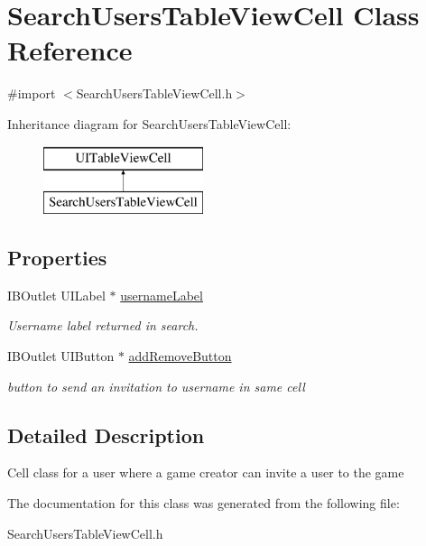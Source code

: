 \hypertarget{interface_search_users_table_view_cell}{\section{Search\+Users\+Table\+View\+Cell Class Reference}
\label{interface_search_users_table_view_cell}
}


{\ttfamily \#import $<$Search\+Users\+Table\+View\+Cell.\+h$>$}

Inheritance diagram for Search\+Users\+Table\+View\+Cell\+:\begin{figure}[H]
\begin{center}
\leavevmode
\includegraphics[height=2.000000cm]{interface_search_users_table_view_cell}
\end{center}
\end{figure}
\subsection*{Properties}
\begin{DoxyCompactItemize}
\item 
\hypertarget{interface_search_users_table_view_cell_a96cc65a772a6d5b580c15eebdedc28e5}{I\+B\+Outlet U\+I\+Label $\ast$ \hyperlink{interface_search_users_table_view_cell_a96cc65a772a6d5b580c15eebdedc28e5}{username\+Label}}\label{interface_search_users_table_view_cell_a96cc65a772a6d5b580c15eebdedc28e5}

\begin{DoxyCompactList}\small\item\em Username label returned in search. \end{DoxyCompactList}\item 
\hypertarget{interface_search_users_table_view_cell_aa5c2d55d32acfaad5f7dbed495618ee5}{I\+B\+Outlet U\+I\+Button $\ast$ \hyperlink{interface_search_users_table_view_cell_aa5c2d55d32acfaad5f7dbed495618ee5}{add\+Remove\+Button}}\label{interface_search_users_table_view_cell_aa5c2d55d32acfaad5f7dbed495618ee5}

\begin{DoxyCompactList}\small\item\em button to send an invitation to username in same cell \end{DoxyCompactList}\end{DoxyCompactItemize}


\subsection{Detailed Description}
Cell class for a user where a game creator can invite a user to the game 

The documentation for this class was generated from the following file\+:\begin{DoxyCompactItemize}
\item 
Search\+Users\+Table\+View\+Cell.\+h\end{DoxyCompactItemize}
